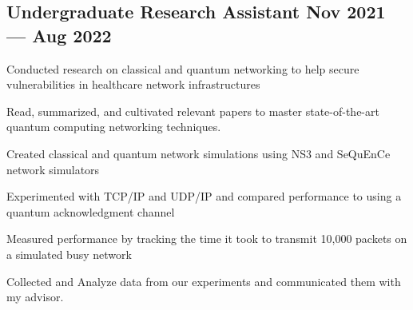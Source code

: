 

\subsection{{Undergraduate Research Assistant \hfill Nov 2021 --- Aug 2022}}
\begin{zitemize}
\begin{zitemize}
\item Conducted research on classical and quantum networking to help secure vulnerabilities in healthcare network infrastructures
\item Read, summarized, and cultivated relevant papers to master state-of-the-art quantum computing networking techniques. 
\item Created classical and quantum network simulations using NS3 and SeQuEnCe network simulators
\item Experimented with TCP/IP and UDP/IP and compared performance to using a quantum acknowledgment channel
\item Measured performance by tracking the time it took to transmit 10,000 packets on a simulated busy network
\item Collected and Analyze data from our experiments and communicated them with my advisor.
\end{zitemize}
\end{zitemize}

